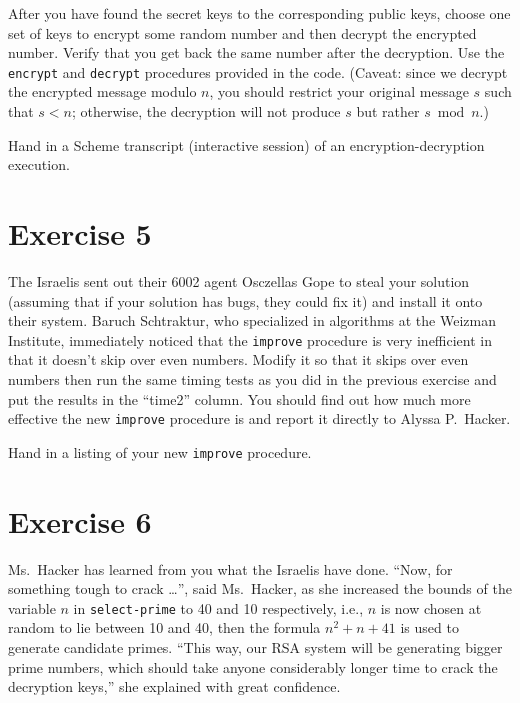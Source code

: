 After you have found the secret keys to the corresponding public keys, choose
one set of keys to encrypt some random number and then decrypt the encrypted
number.  Verify that you get back the same number after the decryption.  Use
the {\tt encrypt} and {\tt decrypt} procedures provided in the code. (Caveat:
since we decrypt the encrypted message modulo $n$, you should restrict your
original message $s$ such that $s < n$; otherwise, the decryption will not
produce $s$ but rather $s \bmod n$.)

Hand in a {\sc Scheme} transcript (interactive session) of an
encryption-decryption execution.

\section{Exercise 5}

The Israelis sent out their 6002 agent Osczellas Gope to steal your
solution (assuming that if your solution has bugs, they could fix it)
and install it onto their system.  Baruch Schtraktur, who specialized
in algorithms at the Weizman Institute, immediately noticed that the
{\tt improve} procedure is very inefficient in that it doesn't skip over
even
numbers.  Modify it so that it skips over even numbers then run
the same timing tests as you did in the previous exercise and put the results
in the ``time2'' column.   You should find out how much more effective the new
{\tt improve} procedure is and report it directly to Alyssa P.\ Hacker.

Hand in a listing of your new {\tt improve} procedure.

\section{Exercise 6}

Ms.~Hacker has learned from you what the Israelis have done.  ``Now, for
something tough to crack \ldots'', said Ms.~Hacker, as she increased the
bounds of the variable $n$ in {\tt select-prime} to 40 and 10
respectively, i.e., $n$ is now chosen at random to lie between 10 and
40, then the formula $n^2+n+41$ is used to generate candidate
primes.  ``This way,
our RSA system will be generating bigger prime numbers, which should take
anyone considerably longer time to crack the decryption keys,'' she
explained with great confidence.

